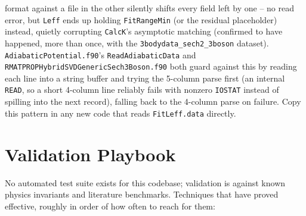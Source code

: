 \documentclass[11pt]{article}
\newcommand{\file}[1]{\texttt{#1}}
\newcommand{\sub}[1]{\texttt{#1}}
\begin{document}
\begin{enumerate}[leftmargin=*]
  format against a file in the other silently shifts every field left by one -- no read error, but
  \texttt{Leff} ends up holding \texttt{FitRangeMin} (or the residual placeholder) instead, quietly
  corrupting \sub{CalcK}'s asymptotic matching (confirmed to have happened, more than once, with
  the \texttt{3bodydata\_sech2\_3boson} dataset). \file{AdiabaticPotential.f90}'s
  \sub{ReadAdiabaticData} and \file{RMATPROPHybridSVDGenericSech3Boson.f90} both guard against this
  by reading each line into a string buffer and trying the 5-column parse first (an internal
  \texttt{READ}, so a short 4-column line reliably fails with nonzero \texttt{IOSTAT} instead of
  spilling into the next record), falling back to the 4-column parse on failure. Copy this pattern
  in any new code that reads \texttt{FitLeff.data} directly.
\end{enumerate}

\section{Validation Playbook}
\label{sec:validation}

No automated test suite exists for this codebase; validation is against known physics invariants
and literature benchmarks. Techniques that have proved effective, roughly in order of
how often to reach for them:
\end{document}

